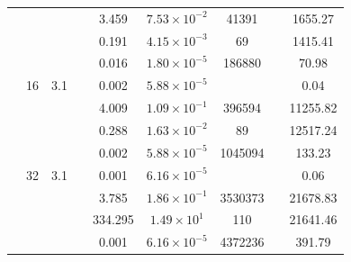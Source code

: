 \begin{table}[htbp]
\begin{tabular}{l S[table-format=3.0] S[table-format=4.1] l S[table-format=3.3] S[table-format=1.2e2] S[table-format=6.0] S[table-format=2.0] S[table-format=4.2]}
     &  &  &  & 3.459 & $7.53 \times 10^{-2}$ & 41391 & {\text{---}} & 1655.27 \\
     &  &  &  & 0.191 & $4.15 \times 10^{-3}$ & 69 & {\text{---}} & 1415.41 \\
     &  &  &  & 0.016 & $1.80 \times 10^{-5}$ & 186880 & {\text{---}} & 70.98 \\
     & 16 & 3.1 &  & 0.002 & $5.88 \times 10^{-5}$ & {\text{---}} & {\text{---}} & 0.04 \\
     &  &  &  & 4.009 & $1.09 \times 10^{-1}$ & 396594 & {\text{---}} & 11255.82 \\
     &  &  &  & 0.288 & $1.63 \times 10^{-2}$ & 89 & {\text{---}} & 12517.24 \\
     &  &  &  & 0.002 & $5.88 \times 10^{-5}$ & 1045094 & {\text{---}} & 133.23 \\
     & 32 & 3.1 &  & 0.001 & $6.16 \times 10^{-5}$ & {\text{---}} & {\text{---}} & 0.06 \\
     &  &  &  & 3.785 & $1.86 \times 10^{-1}$ & 3530373 & {\text{---}} & 21678.83 \\
     &  &  &  & 334.295 & $1.49 \times 10^{1}$ & 110 & {\text{---}} & 21641.46 \\
     &  &  &  & 0.001 & $6.16 \times 10^{-5}$ & 4372236 & {\text{---}} & 391.79 \\
    \bottomrule
  \end{tabular}
\end{table}
